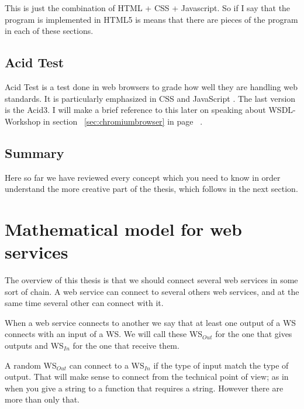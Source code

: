\documentclass[a4paper,10pt]{article}
\begin{document}
  This is just the combination of HTML + CSS + Javascript. So if I say that the program is implemented in HTML5 is means that there are pieces of the program in each of these sections.

  \subsection{Acid Test}
  \label{sec:acid}

  Acid Test is a test done in web browsers to grade how well they are handling web standards. It is particularly emphasized in CSS and JavaScript \cite{:AcidTest}. The last version is the Acid3. I will make a brief reference to this later on speaking about WSDL-Workshop in section ~\ref{sec:chromiumbrowser} in page ~\pageref{sec:chromiumbrowser}.

  \subsection{Summary}

  Here so far we have reviewed every concept which you need to know in order understand the more creative part of the thesis, which follows in the next section.

  \newpage

\section{Mathematical model for web services}
\label{chap:theory}

  The overview of this thesis is that we should connect several web services in some sort of chain. A web service can connect to several others web services, and at the same time several other can connect with it.\vspace{3 mm}

  When a web service connects to another we say that at least one output of a WS connects with an input of a WS. We will call these WS$_{Out}$ for the one that gives outputs and WS$_{In}$ for the one that receive them.\vspace{3 mm}

  A random WS$_{Out}$ can connect to a WS$_{In}$ if the type of input match the type of output. That will make sense to connect from the technical point of view; as in when you give a string to a function that requires a string. However there are more than only that.\vspace{3 mm}
\end{document}
